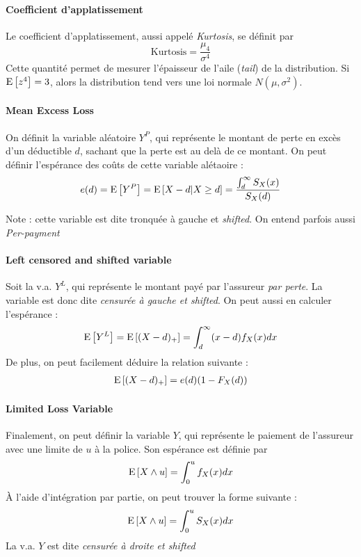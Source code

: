 \documentclass[12pt, french]{report}
\begin{document}
\paragraph{Coefficient d'applatissement}
Le coefficient d'applatissement, aussi appelé \textit{Kurtosis}, se définit par
\begin{equation}
\text{Kurtosis} = \frac{\mu_4}{\sigma^4}
\end{equation}
Cette quantité permet de mesurer l'épaisseur de l'aile (\textit{tail}) de la distribution. Si $\mathrm{E} \left[ z^4 \right] =3$, alors la distribution tend vers une loi normale $N(\mu, \sigma^2)$.

\paragraph{Mean Excess Loss}
On définit la variable aléatoire $Y^P$, qui représente le montant de perte en excès d'un déductible $d$, sachant que la perte est au delà de ce montant. On peut définir l'espérance des coûts de cette variable alétaoire : 
\begin{equation}
e(d) = \mathrm{E} \left[ Y^P \right] = \mathrm{E} \left[ X-d | X \geq d \right] = \frac{\int_{d}^{\infty} S_X(x)}{S_X(d)}
\end{equation}

Note : cette variable est dite tronquée à gauche et \textit{shifted}. On entend parfois aussi \textit{Per-payment}
	

\paragraph{Left censored and shifted variable}
Soit la v.a. $Y^L$, qui représente le montant payé par l'assureur \textit{par perte}. La variable est donc dite \textit{censurée à gauche et shifted}. On peut aussi en calculer l'espérance : 
\begin{equation}
\mathrm{E} \left[ Y^L \right] = \mathrm{E} \left[ (X-d)_+ \right] = \int_{d}^{\infty} (x-d) f_X(x) dx
\end{equation}
De plus, on peut facilement déduire la relation suivante : 
\begin{align*}
\mathrm{E} \left[ (X-d)_+ \right] = e(d) (1 - F_X(d))
\end{align*}

\paragraph{Limited Loss Variable} Finalement, on peut définir la variable $Y$, qui représente le paiement de l'assureur avec une limite de $u$ à la police. Son espérance est définie par
\begin{equation}
\mathrm{E} \left[ X \wedge u \right] = \int_{0}^{u} f_X(x) dx
\end{equation}
À l'aide d'intégration par partie, on peut trouver la forme suivante : 
\begin{align*}
\mathrm{E} \left[ X \wedge u \right] = \int_{0}^{u} S_X(x) dx
\end{align*}
La v.a. $Y$ est dite \textit{censurée à droite et shifted}
\end{document}
